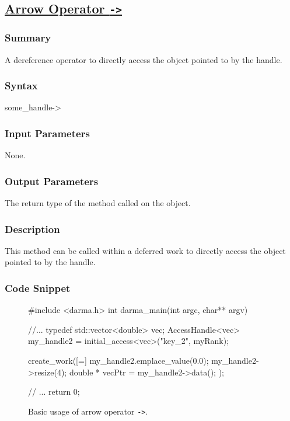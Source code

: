 \clearpage
\subsection{\underline{Arrow Operator \texttt{->}}}

\hspace{0.1cm} %
\begin{subs}
\vspace{-1.2cm}

\subsubsection{Summary} 
A dereference operator to directly access the object 
pointed to by the handle.


\subsubsection{Syntax} 
\begin{CppCode}
some_handle->
\end{CppCode}

\subsubsection{Input Parameters} 
None.

\subsubsection{Output Parameters} 
The return type of the method called on the object.

\subsubsection{Description} 
This method can be called within a deferred work to directly 
access the object pointed to by the handle.


\subsubsection{Code Snippet} 
\begin{figure}[!h]
\begin{CppCodeNumb}
#include <darma.h>
int darma_main(int argc, char** argv)
{
	//...
  typedef std::vector<double> vec;
  AccessHandle<vec> my_handle2 = initial_access<vec>("key_2", myRank);

  create_work([=]{
  	my_handle2.emplace_value(0.0);
    my_handle2->resize(4);
    double * vecPtr = my_handle2->data();    
  });

  // ... 
  return 0;
}
\end{CppCodeNumb}
\label{fig:fe_api_initialaccess}
\caption{Basic usage of arrow operator \texttt{->}.}
\end{figure}

\end{subs}







